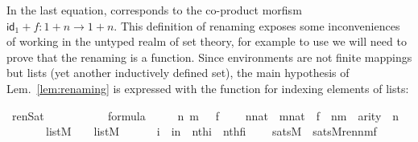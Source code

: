 In the last equation,  corresponds to
the co-product morfism $\mathsf{id}_{1}+f \colon 1 + n \to 1 +
n$. This definition of renaming exposes some inconveniences of working
in the untyped realm of set theory, for example to use  we
will need to prove that the renaming is a function. Since environments
are not finite mappings but lists (yet another inductively defined
set), the main hypothesis of Lem.~\ref{lem:renaming} is expressed with
the  function for indexing elements of lists:
\begin{isabelle}
\isamarkupfalse%
\ renSat\ {\isacharcolon}\ \isanewline
\ \ \ {\isasymphi}\isanewline
\ \ \ {\isachardoublequoteopen}{\isasymphi}\ {\isasymin}\ formula{\isachardoublequoteclose}\isanewline
\ \ \ \ {\isachardoublequoteopen}{\isasymAnd}\ n\ m\ {\isasymrho}\ {\isasymrho}{\isacharprime}\ f\ {\isachardot}\ \isanewline
\ \ {\isasymlbrakk}n{\isasymin}nat\ {\isacharsemicolon}\ m{\isasymin}nat\ {\isacharsemicolon}\ f\ {\isasymin}\ n{\isasymrightarrow}m\ {\isacharsemicolon}\ arity{\isacharparenleft}{\isasymphi}{\isacharparenright}\ {\isasymle}\ n\ {\isacharsemicolon}\isanewline
\ \ \ \ \ {\isasymrho}\ {\isasymin}\ list{\isacharparenleft}M{\isacharparenright}\ {\isacharsemicolon}\ {\isasymrho}{\isacharprime}\ {\isasymin}\ list{\isacharparenleft}M{\isacharparenright}\ {\isacharsemicolon}\ \isanewline
\ \ \ {\isasymAnd}\ i\ {\isachardot}\ i{\isacharless}n\ {\isasymLongrightarrow}\ nth{\isacharparenleft}i{\isacharcomma}{\isasymrho}{\isacharparenright}\ {\isacharequal}\ nth{\isacharparenleft}f{\isacharbackquote}i{\isacharcomma}{\isasymrho}{\isacharprime}{\isacharparenright}\ {\isasymrbrakk}\ {\isasymLongrightarrow}\isanewline
\ \ sats{\isacharparenleft}M{\isacharcomma}{\isasymphi}{\isacharcomma}{\isasymrho}{\isacharparenright}\ {\isasymlongleftrightarrow}\ sats{\isacharparenleft}M{\isacharcomma}ren{\isacharparenleft}{\isasymphi}{\isacharparenright}{\isacharbackquote}n{\isacharbackquote}m{\isacharbackquote}f{\isacharcomma}{\isasymrho}{\isacharprime}{\isacharparenright}{\isachardoublequoteclose}\end{isabelle}


